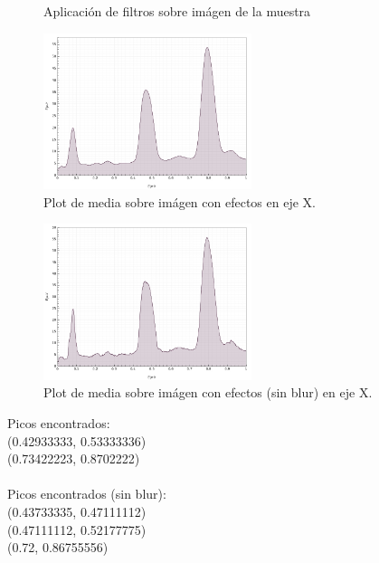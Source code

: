 \begin{itemize}
\begin{figure}[H]
	\caption{Aplicaci\'on de filtros sobre im\'agen de la muestra}
	\centering
	\end{figure}
	\begin{figure}[H]
	  \vspace{-0.2cm}
	  \centering
	  \includegraphics[width=230px]{imagenes-jtlc/experimento/search-peaks/1/plot-x}
	  \centering
	  \vspace{-0.4cm}
	  \caption{Plot de media sobre im\'agen con efectos en eje X.}
	  \label{fig:sp-1-plot-x}
	  \vspace{-0.15cm}
	\end{figure}
	\begin{figure}[H]
	  \vspace{-0.2cm}
	  \centering
	  \includegraphics[width=230px]{imagenes-jtlc/experimento/search-peaks/1/plot-x-no-blur}
	  \centering
	  \vspace{-0.4cm}
	  \caption{Plot de media sobre im\'agen con efectos (sin blur) en eje X.}
	  \label{fig:sp-1-plot-x-no-blur}
	  \vspace{-0.15cm}
	\end{figure}
	Picos encontrados:\\
	(0.42933333, 0.53333336)\\
	(0.73422223, 0.8702222)\\ \\
	Picos encontrados (sin blur):\\
	(0.43733335, 0.47111112)\\
	(0.47111112, 0.52177775)\\
	(0.72, 0.86755556)\\
	

\end{itemize}
